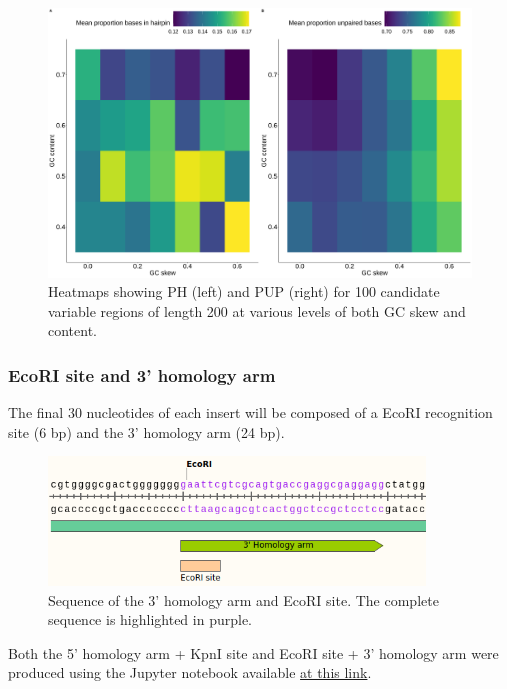 \documentclass[11pt]{article}
\begin{document}
\begin{figure}[H]
	\includegraphics[width=14cm]{images/plots/rna_secondary_structure_temp.png}
	\centering
	\caption{Heatmaps showing PH (left) and PUP (right) for 100 candidate variable regions of length 200 at various levels of both GC skew and content.}
	\label{fig:rna_secondary_structure}
\end{figure}


\subsubsection{EcoRI site and 3' homology arm}

The final 30 nucleotides of each insert will be composed of a EcoRI recognition site (6 bp) and the 3' homology arm (24 bp). 

\begin{figure}[H]
	\includegraphics[width=10cm]{images/variable_region/3_homology_arm.png}
	\centering
	\caption{Sequence of the 3' homology arm and EcoRI site. The complete sequence is highlighted in purple.}
	\label{fig:3_prime_arm}
\end{figure}

Both the 5' homology arm + KpnI site and EcoRI site + 3' homology arm were produced using the Jupyter notebook available \href{https://github.com/EthanHolleman/plasmid-VR-design/blob/main/notes/homology_arms.ipynb}{at this link}.
\end{document}
